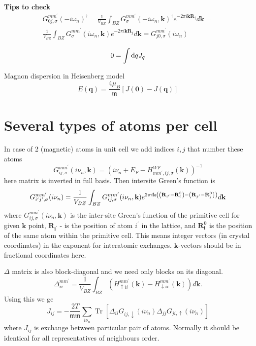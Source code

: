 \documentclass[12pt,a4paper]{article}
\begin{document}
\begin{tcolorbox}
\textbf{Tips to check}
    \begin{multline*}
        G_{0 j, \sigma}^{m m^{\prime}}( - i \omega_n)^{\dagger} = \frac{1}{V_{BZ}} \int_{B Z} G_{\sigma}^{m m^{\prime}}(- i \omega_n, \mathbf{k})^{\dagger} e^{- 2 \pi i \mathbf{k} \mathbf{R}_{j}} d \mathbf{k} = \\
        \frac{1}{V_{BZ}} \int_{B Z} G_{\sigma}^{m m^{\prime}}( i \omega_n, \mathbf{k}) e^{- 2 \pi i \mathbf{k} \mathbf{R}_{j}} d \mathbf{k} = G_{j 0, \sigma}^{m m^{\prime}}(  i \omega_n)
    \end{multline*}

    \[
    0 = \int \mathop{}\!\mathrm{d} q J_{q}
    \]

\end{tcolorbox}

Magnon dispersion in Heisenberg model
\[
    E(\mathbf{q})=\frac{4 \mu_B}{{\mathfrak m}}[J(\mathbf{0})-J(\mathbf{q})]
\]



\section{Several types of atoms per cell} %
\label{sub:1}
In case of 2 (magnetic) atoms in unit cell we add indices $ i, j$ that number these atoms
\[
    G_{i j, \sigma}^{m m^{\prime}}(i \nu_n, \mathbf{k})=\left(i \nu_n + E_F-H_{m m^{\prime}, i j, \sigma}^{W F}(\mathbf{k})\right)^{-1}
\]
here matrix is inverted in full basis. Then intersite Green's function is
$$
G_{i^{\prime} j^{\prime}, \sigma}^{m m^{\prime}}(i \nu_n) = \frac{1}{V_{BZ}} \int_{B Z} G_{i j, \sigma}^{m m^{\prime}}(i \nu_n, \mathbf{k}) e^{2 \pi i \mathbf{k} \left(\left(\mathbf{R}_{i^{\prime}}-\mathbf{R}_i^0\right)-\left(\mathbf{R}_{j^{\prime}}-\mathbf{R}_j^0\right)\right)} d \mathbf{k}\\
$$
where $G_{i j, \sigma}^{m m^{\prime}}(i \nu_n, \mathbf{k})$ is the inter-site Green's function of the primitive cell for given $\mathbf{k}$ point, 
$\mathbf{R}_{\mathbf{i}^{\prime}}$ - is the position of atom $i^{\prime}$ in the lattice, and $\mathbf{R}_{\mathbf{i}}^{\mathbf{0}}$ is the position of the same atom within the primitive cell.
This means integer vectors (in crystal coordinates) in the exponent for interatomic exchanges. $\mathbf{k}$-vectors should be in fractional coordinates here. 

$\Delta$ matrix is also block-diagonal and we need only blocks on its diagonal.
\begin{equation}
    \Delta_{i i}^{m m^{\prime}} = \frac{1}{V_{BZ}} \int_{B Z}\left(H_{ \uparrow i i}^{m m^{\prime}}(\mathbf{k})-H_{ \downarrow i i}^{m m^{\prime}}(\mathbf{k})\right) d \mathbf{k} .
\end{equation}
Using this we ge
\begin{equation}
    J_{i j}  = -\frac{2 T}{{\mathfrak m} {\mathfrak m}}  \sum_{i \nu_n} \operatorname{Tr}
    \left[\Delta_{ i i} G_{i j, \downarrow}(i \nu_n) \Delta_{j j} G_{j i, \uparrow}(i \nu_n) \right]
\end{equation} where $J_{i j}$ is exchange between particular pair of atoms. 
Normally it should be identical for all representatives of neighbours order.
\end{document}
